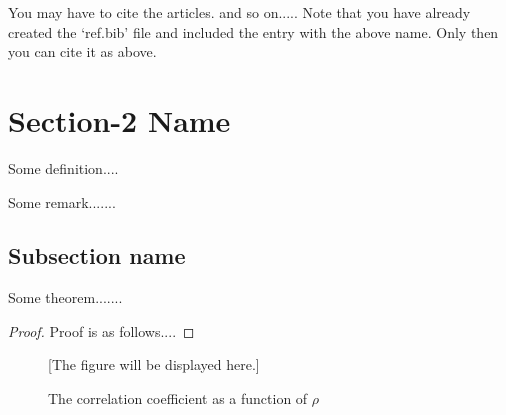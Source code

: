 You may have to cite the articles.   and so on.....
Note that you have already created the `ref.bib' file and included the entry with the above name. Only then you can cite it as above.  

\section{Section-2 Name}
\begin{definition}\label{abcd}
Some definition....
\end{definition}

\begin{remark}
Some remark.......
\end{remark}

\subsection{Subsection name}

\begin{theorem}
Some theorem.......
\end{theorem}

\begin{proof}
Proof is as follows....
\end{proof}


\begin{figure}[h]
\label{fig1}
[The figure will be displayed here.]

\caption{The correlation coefficient as a function of $\rho$}
\end{figure}
